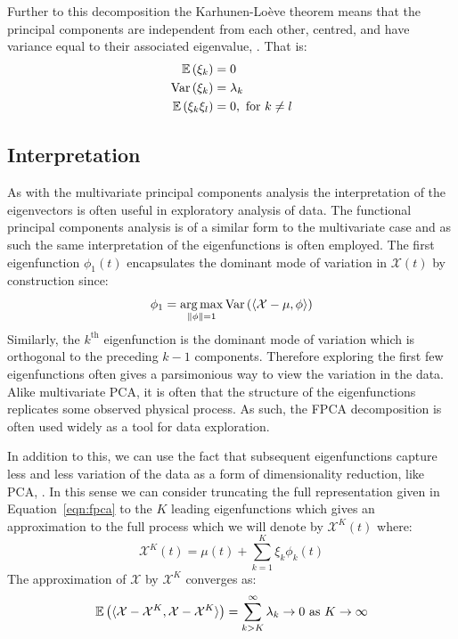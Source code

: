 Further to this decomposition the Karhunen-Lo\`{e}ve theorem means that the principal components are independent from each other, centred, and have variance equal to their associated eigenvalue, \citep{karhunen_zur_1946, loeve_fonctions_1946}.
That is:
\begin{align}
	\operatorname{\mathbb{E}}\left(\xi_k\right) &= 0 \\
	\text{Var}\left(\xi_k\right) &= \lambda_k \\
	\operatorname{\mathbb{E}}\left(\xi_k \xi_l\right) &= 0,~\text{for}~ k \ne l \label{eqn:principal_comp_uncorr}
\end{align}

\subsection{Interpretation}
As with the multivariate principal components analysis the interpretation of the eigenvectors is often useful in exploratory analysis of data.
The functional principal components analysis is of a similar form to the multivariate case and as such the same interpretation of the eigenfunctions is often employed.
The first eigenfunction $\phi_1(t)$ encapsulates the dominant mode of variation in $\mathcal{X}(t)$ by construction since:
\begin{equation}\label{eqn:first_comp}
	\phi_1 = \operatorname*{arg\,max}_{\lVert \phi \rVert=1} \text{Var}\left( \langle  \mathcal{X} - \mu, \phi \rangle  \right)
\end{equation}
Similarly, the $k^\text{th}$ eigenfunction is the dominant mode of variation which is orthogonal to the preceding $k-1$ components.
Therefore exploring the first few eigenfunctions often gives a parsimonious way to view the variation in the data.
Alike multivariate PCA, it is often that the structure of the eigenfunctions replicates some observed physical process.
As such, the FPCA decomposition is often used widely as a tool for data exploration. 

In addition to this, we can use the fact that subsequent eigenfunctions capture less and less variation of the data as a form of dimensionality reduction, like PCA, \citep{wold_principal_1987}.
In this sense we can consider truncating the full representation given in Equation~\eqref{eqn:fpca} to the $K$ leading eigenfunctions which gives an approximation to the full process which we will denote by $\mathcal{X}^K(t)$ where:
\begin{equation}\label{eqn:fpca_trun}
	\mathcal{X}^K(t)  =   \mu(t) + \sum_{k=1}^{K}\xi_k \phi_k(t)
\end{equation}
The approximation of $\mathcal{X}$ by $\mathcal{X}^K$ converges as:
\begin{equation}\label{eqn:fpca_trun_conv}
	\operatorname{\mathbb{E}} \left( \langle  \mathcal{X} - \mathcal{X}^K, \mathcal{X} - \mathcal{X}^K \rangle \right)  =   \sum_{k > K}^{\infty} \lambda_k \to 0~\text{as}~K \to \infty
\end{equation}

